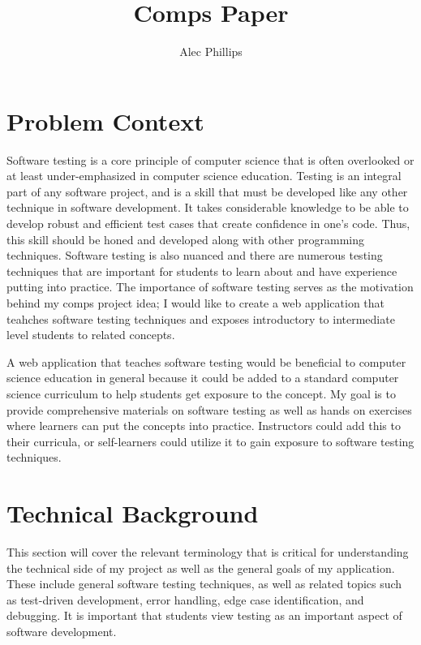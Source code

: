 \documentclass[10pt,twocolumn]{article}
\title{Comps Paper}
\author{Alec Phillips}
\affiliation{Occidental College}
\begin{document}
\maketitle

\section{Problem Context}


Software testing is a core principle of computer science that is often overlooked or at least under-emphasized in 
computer science education. Testing is an integral part of any software project, and is a skill that must be developed 
like any other technique in software development. It takes considerable knowledge to be able to develop robust and 
efficient test cases that create confidence in one's code. Thus, this skill should be honed and developed along with 
other programming techniques. Software testing is also nuanced and there are numerous testing techniques that are 
important for students to learn about and have experience putting into practice. The importance of software testing 
serves as the motivation behind my comps project idea; I would like to create a web application that teahches software 
testing techniques and exposes introductory to intermediate level students to related concepts. 

A web application that teaches software testing would be beneficial to computer science education in general because 
it could be added to a standard computer science curriculum to help students get exposure to the concept. My goal is to 
provide comprehensive materials on software testing as well as hands on exercises where learners can put the concepts 
into practice. Instructors could add this to their curricula, or self-learners could utilize it to gain exposure to 
software testing techniques. 

\section{Technical Background}

This section will cover the relevant terminology that is critical for understanding the technical side of my project as
well as the general goals of my application. These include general software testing techniques, as well as related topics
such as test-driven development, error handling, edge case identification, and debugging. It is important that students
view testing as an important aspect of software development.
\end{document}
